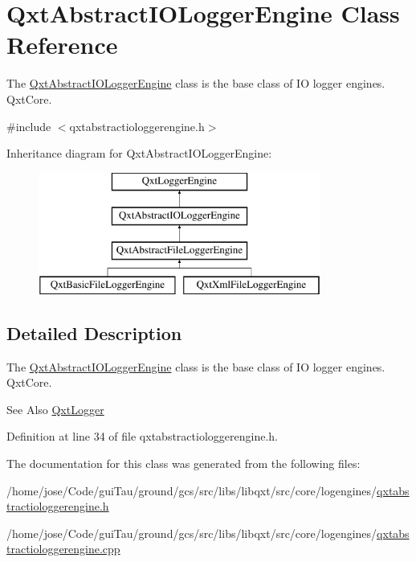 \hypertarget{class_qxt_abstract_i_o_logger_engine}{\section{Qxt\-Abstract\-I\-O\-Logger\-Engine Class Reference}
\label{class_qxt_abstract_i_o_logger_engine}
}


The \hyperlink{class_qxt_abstract_i_o_logger_engine}{Qxt\-Abstract\-I\-O\-Logger\-Engine} class is the base class of I\-O logger engines.  Qxt\-Core.  




{\ttfamily \#include $<$qxtabstractiologgerengine.\-h$>$}

Inheritance diagram for Qxt\-Abstract\-I\-O\-Logger\-Engine\-:\begin{figure}[H]
\begin{center}
\leavevmode
\includegraphics[height=4.000000cm]{class_qxt_abstract_i_o_logger_engine}
\end{center}
\end{figure}


\subsection{Detailed Description}
The \hyperlink{class_qxt_abstract_i_o_logger_engine}{Qxt\-Abstract\-I\-O\-Logger\-Engine} class is the base class of I\-O logger engines.  Qxt\-Core. 

\begin{DoxySeeAlso}{See Also}
\hyperlink{class_qxt_logger}{Qxt\-Logger} 
\end{DoxySeeAlso}


Definition at line 34 of file qxtabstractiologgerengine.\-h.



The documentation for this class was generated from the following files\-:\begin{DoxyCompactItemize}
\item 
/home/jose/\-Code/gui\-Tau/ground/gcs/src/libs/libqxt/src/core/logengines/\hyperlink{qxtabstractiologgerengine_8h}{qxtabstractiologgerengine.\-h}\item 
/home/jose/\-Code/gui\-Tau/ground/gcs/src/libs/libqxt/src/core/logengines/\hyperlink{qxtabstractiologgerengine_8cpp}{qxtabstractiologgerengine.\-cpp}\end{DoxyCompactItemize}

